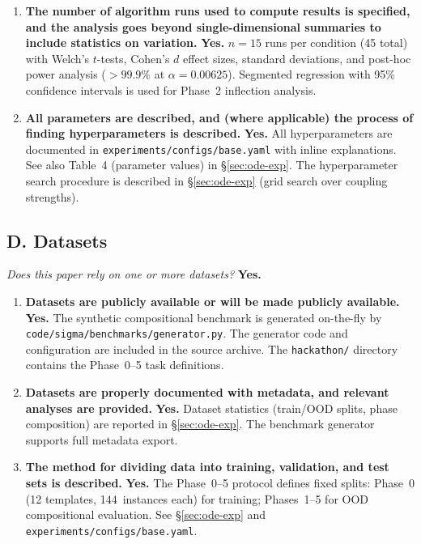 \documentclass[10pt]{article}
\begin{document}
\begin{enumerate}
  \item \textbf{The number of algorithm runs used to compute results is specified,
    and the analysis goes beyond single-dimensional summaries to include
    statistics on variation.}
    \textbf{Yes.} $n = 15$ runs per condition (45 total) with Welch's
    $t$-tests, Cohen's $d$ effect sizes, standard deviations, and
    post-hoc power analysis ($>99.9\%$ at $\alpha = 0.00625$).
    Segmented regression with 95\% confidence intervals is used for
    Phase~2 inflection analysis.

  \item \textbf{All parameters are described, and (where applicable) the process
    of finding hyperparameters is described.}
    \textbf{Yes.} All hyperparameters are documented in
    \texttt{experiments/configs/base.yaml} with inline explanations.
    See also Table~4 (parameter values) in \S\ref{sec:ode-exp}.
    The hyperparameter search procedure is described in
    \S\ref{sec:ode-exp} (grid search over coupling strengths).
\end{enumerate}

\subsection*{D. Datasets}
\noindent\textit{Does this paper rely on one or more datasets?} \textbf{Yes.}

\begin{enumerate}
  \item \textbf{Datasets are publicly available or will be made publicly available.}
    \textbf{Yes.} The synthetic compositional benchmark is generated
    on-the-fly by \texttt{code/sigma/benchmarks/generator.py}. The
    generator code and configuration are included in the source archive.
    The \texttt{hackathon/} directory contains the Phase~0--5 task
    definitions.

  \item \textbf{Datasets are properly documented with metadata, and relevant
    analyses are provided.}
    \textbf{Yes.} Dataset statistics (train/OOD splits, phase composition)
    are reported in \S\ref{sec:ode-exp}. The benchmark generator supports
    full metadata export.

  \item \textbf{The method for dividing data into training, validation, and test
    sets is described.}
    \textbf{Yes.} The Phase~0--5 protocol defines fixed splits: Phase~0
    (12 templates, 144~instances each) for training; Phases~1--5 for
    OOD compositional evaluation. See \S\ref{sec:ode-exp} and
    \texttt{experiments/configs/base.yaml}.
\end{enumerate}

\enlargethispage*{1.5cm}
\end{document}
